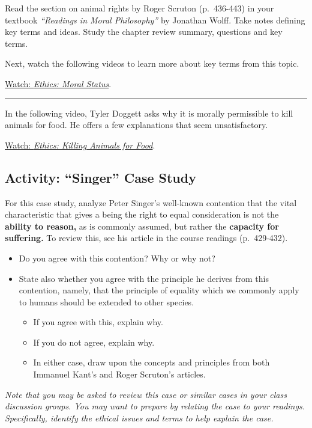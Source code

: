 \documentclass[
]{book}
\providecommand{\tightlist}{%
  \setlength{\itemsep}{0pt}\setlength{\parskip}{0pt}}
\begin{document}
\begin{reflect}
Read the section on animal rights by Roger Scruton (p.~436-443) in your textbook \emph{``Readings in Moral Philosophy''} by Jonathan Wolff. Take notes defining key terms and ideas. Study the chapter review summary, questions and key terms.

Next, watch the following videos to learn more about key terms from this topic.

\href{https://www.youtube.com/watch?v=smuhAjyRbw0\&t=3s}{Watch: \emph{Ethics: Moral Status}}.

\begin{center}\rule{0.5\linewidth}{0.5pt}\end{center}

In the following video, Tyler Doggett asks why it is morally permissible to kill animals for food. He offers a few explanations that seem unsatisfactory.

\href{https://www.youtube.com/watch?v=3HAMk_ZYO7g}{Watch: \emph{Ethics: Killing Animals for Food}}.
\end{reflect}

\hypertarget{activity-singer-case-study}{%
\subsection*{Activity: ``Singer'' Case Study}\label{activity-singer-case-study}}

\begin{reflect}
For this case study, analyze Peter Singer's well-known contention that the vital characteristic that gives a being the right to equal consideration is not the \textbf{ability to reason,} as is commonly assumed, but rather the \textbf{capacity for suffering.} To review this, see his article in the course readings (p.~429-432).

\begin{itemize}
\tightlist
\item
  Do you agree with this contention? Why or why not?
\item
  State also whether you agree with the principle he derives from this contention, namely, that the principle of equality which we commonly apply to humans should be extended to other species.

  \begin{itemize}
  \tightlist
  \item
    If you agree with this, explain why.
  \item
    If you do not agree, explain why.
  \item
    In either case, draw upon the concepts and principles from both Immanuel Kant's and Roger Scruton's articles.
  \end{itemize}
\end{itemize}

\emph{Note that you may be asked to review this case or similar cases in your class discussion groups. You may want to prepare by relating the case to your readings. Specifically, identify the ethical issues and terms to help explain the case.}
\end{reflect}
\end{document}
